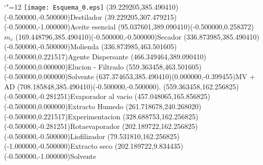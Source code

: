 \documentclass[12pt]{article}
\begin{document}
\makeatletter%
\let\ASYencoding\f@encoding%
\let\ASYfamily\f@family%
\let\ASYseries\f@series%
\let\ASYshape\f@shape%
\makeatother%
{\catcode`"=12%
\texttt{[image: Esquema\_0.eps]}%
}%
\kern -711.318898pt%
\color{ASYcolor}
\fontsize{12.000000}{14.400000}\selectfont
\usefont{\ASYencoding}{\ASYfamily}{\ASYseries}{\ASYshape}%
\ASYalign(39.229205,385.490410)(-0.500000,-0.500000){Destilador}%
\color{ASYcolor}
\fontsize{12.000000}{14.400000}\selectfont
\ASYalign(39.229205,307.479215)(-0.500000,-1.000000){Aceite esencial}%
\color{ASYcolor}
\fontsize{12.000000}{14.400000}\selectfont
\ASYalign(95.037601,389.090410)(-0.500000,0.258372){$m_v$}%
\color{ASYcolor}
\fontsize{12.000000}{14.400000}\selectfont
\ASYalign(169.448796,385.490410)(-0.500000,-0.500000){Secador}%
\color{ASYcolor}
\fontsize{12.000000}{14.400000}\selectfont
\ASYalign(336.873985,385.490410)(-0.500000,-0.500000){Molienda}%
\color{ASYcolor}
\fontsize{12.000000}{14.400000}\selectfont
\ASYalign(336.873985,463.501605)(-0.500000,0.221517){Agente Dispersante}%
\color{ASYcolor}
\fontsize{12.000000}{14.400000}\selectfont
\ASYalign(466.349464,389.090410)(-0.500000,0.000000){Elucion - Filtrado}%
\color{ASYcolor}
\fontsize{12.000000}{14.400000}\selectfont
\ASYalign(559.363458,463.501605)(-0.500000,0.000000){Solvente}%
\color{ASYcolor}
\fontsize{12.000000}{14.400000}\selectfont
\ASYalign(637.374653,385.490410)(0.000000,-0.399455){MV + AD}%
\color{ASYcolor}
\fontsize{12.000000}{14.400000}\selectfont
\ASYalign(708.185848,385.490410)(-0.500000,-0.500000){.}%
\color{ASYcolor}
\fontsize{12.000000}{14.400000}\selectfont
\ASYalign(559.363458,162.256825)(-0.500000,-0.281251){Evaporador al vacio}%
\color{ASYcolor}
\fontsize{12.000000}{14.400000}\selectfont
\ASYalign(457.048065,165.856825)(-0.500000,0.000000){Extracto Humedo}%
\color{ASYcolor}
\fontsize{12.000000}{14.400000}\selectfont
\ASYalign(261.718678,240.268020)(-0.500000,0.221517){Experimentacion}%
\color{ASYcolor}
\fontsize{12.000000}{14.400000}\selectfont
\ASYalign(328.688753,162.256825)(-0.500000,-0.281251){Rotaevaporador}%
\color{ASYcolor}
\fontsize{12.000000}{14.400000}\selectfont
\ASYalign(202.189722,162.256825)(-0.500000,-0.500000){Liofilizador}%
\color{ASYcolor}
\fontsize{12.000000}{14.400000}\selectfont
\ASYalign(79.531810,162.256825)(-1.000000,-0.500000){Extracto seco}%
\color{ASYcolor}
\fontsize{12.000000}{14.400000}\selectfont
\ASYalign(202.189722,9.834435)(-0.500000,-1.000000){Solvente}%
\end{document}
